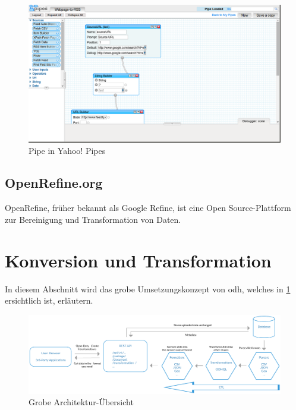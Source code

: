 \begin{figure}[H]
    \centering
    \includegraphics[width=2\linewidth/3]{fig/yahoo-pipes}
    \caption{Pipe in Yahoo! Pipes}
\end{figure}

\subsection{OpenRefine.org}
OpenRefine, früher bekannt als Google Refine, ist eine Open Source-Plattform zur Bereinigung und Transformation von Daten.

\section{Konversion und Transformation}

In diesem Abschnitt wird das grobe Umsetzungskonzept von \gls{odh}, welches in \cref{fig:tb:arch-overview} ersichtlich ist, erläutern. 
\begin{figure}[H]
    \centering
    \includegraphics[width=\linewidth]{../projektdokumentation/fig/ODH-Architecture-Overview}
    \caption{Grobe Architektur-Übersicht}
    \label{fig:tb:arch-overview}
\end{figure}

